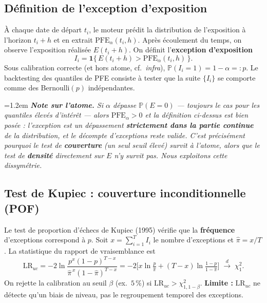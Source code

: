 \documentclass[11pt,a4paper]{article}
\newcommand{\PFE}{\mathrm{PFE}}
\newcommand{\Prob}{\mathbb{P}}
\newcommand{\Indic}{\mathbf{1}}
\newcommand{\LRuc}{\mathrm{LR}_{uc}}
\newenvironment{remarque}
  {\par\smallskip\noindent\begin{minipage}{\linewidth}\leftskip=1.2em
   \footnotesize\itshape}
  {\end{minipage}\par\smallskip}
\theoremstyle{remark}
\begin{document}
\subsection{Définition de l'exception d'exposition}

À chaque date de départ $t_i$, le moteur prédit la distribution de l'exposition à l'horizon $t_i + h$ et en extrait $\PFE_\alpha(t_i, h)$. Après écoulement du temps, on observe l'exposition réalisée $E(t_i + h)$. On définit l'\textbf{exception d'exposition}
\begin{equation}
\boxed{\;I_i = \Indic\big\{\, E(t_i + h) > \PFE_\alpha(t_i, h)\,\big\}.\;}
\end{equation}
Sous calibration correcte (et hors atome, cf.\ \emph{infra}), $\Prob(I_i = 1) = 1-\alpha =: p$. Le backtesting des quantiles de PFE consiste à tester que la suite $\{I_i\}$ se comporte comme des Bernoulli$(p)$ indépendantes.

\begin{remarque}
\textbf{Note sur l'atome.} Si $\alpha$ dépasse $\Prob(E=0)$ --- toujours le cas pour les quantiles élevés d'intérêt --- alors $\PFE_\alpha > 0$ et la définition ci-dessus est bien posée : l'exception est un dépassement \textbf{strictement dans la partie continue} de la distribution, et le décompte d'exceptions reste valide. C'est précisément pourquoi le test de \textbf{couverture} (un seul seuil élevé) survit à l'atome, alors que le test de \textbf{densité} directement sur $E$ n'y survit pas. Nous exploitons cette dissymétrie.
\end{remarque}

\subsection{Test de Kupiec : couverture inconditionnelle (POF)}

Le test de proportion d'échecs de Kupiec (1995) vérifie que la \textbf{fréquence} d'exceptions correspond à $p$. Soit $x = \sum_{i=1}^{T} I_i$ le nombre d'exceptions et $\hat\pi = x/T$. La statistique du rapport de vraisemblance est
\begin{equation}
\boxed{\;\LRuc = -2\ln\!\frac{p^{x}(1-p)^{T-x}}{\hat\pi^{\,x}(1-\hat\pi)^{T-x}}
= -2\Big[x\ln\tfrac{p}{\hat\pi} + (T-x)\ln\tfrac{1-p}{1-\hat\pi}\Big] \;\xrightarrow{d}\; \chi^2_1.\;}
\end{equation}
On rejette la calibration au seuil $\beta$ (ex.\ $5\,\%$) si $\LRuc > \chi^2_{1,1-\beta}$. \textbf{Limite :} $\LRuc$ ne détecte qu'un biais de niveau, pas le regroupement temporel des exceptions.
\end{document}
